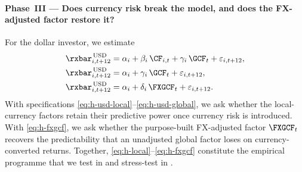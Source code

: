 \paragraph{Phase~III --- Does currency risk break the model, and does the
FX-adjusted factor restore it?}
For the dollar investor, we estimate
\begin{align}
  \rxbar^{\,\mathrm{USD}}_{i,t+12}
     &= \alpha_{i} + \beta_{i}\,\CF_{i,t}
        + \gamma_{i}\,\GCF_{t} + \varepsilon_{i,t+12},
        \label{eq:h-usd-local}\\
  \rxbar^{\,\mathrm{USD}}_{i,t+12}
     &= \alpha_{i} + \gamma_{i}\,\GCF_{t} + \varepsilon_{i,t+12},
        \label{eq:h-usd-global}\\
  \rxbar^{\,\mathrm{USD}}_{i,t+12}
     &= \alpha_{i} + \delta_{i}\,\FXGCF_{t} + \varepsilon_{i,t+12}.
        \label{eq:h-fxgcf}
\end{align}
With specifications \eqref{eq:h-usd-local}--\eqref{eq:h-usd-global}, we ask
whether the local-currency factors retain their predictive power once currency
risk is introduced. With \eqref{eq:h-fxgcf}, we ask whether the purpose-built
FX-adjusted factor $\FXGCF_{t}$ recovers the predictability that an unadjusted
global factor loses on currency-converted returns. Together,
\eqref{eq:h-local}--\eqref{eq:h-fxgcf} constitute the empirical programme that
we test in  and stress-test in .
